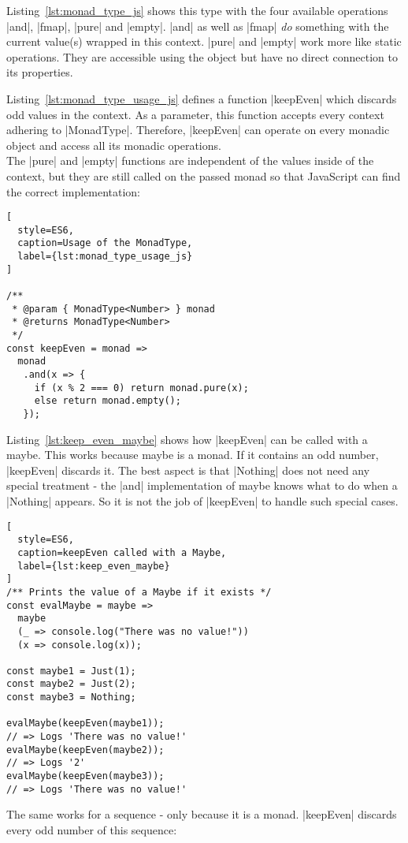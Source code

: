 Listing~\ref{lst:monad_type_js} shows this type with the four available
operations |and|, |fmap|, |pure| and |empty|. |and| as well as |fmap| \textit{do}
something with the current value(s) wrapped in this context. |pure| and |empty|
work more like static operations. They are accessible using the object but have
no direct connection to its properties. 

Listing~\ref{lst:monad_type_usage_js} defines a function |keepEven| which
discards odd values in the context. As a parameter, this function accepts every context
adhering to |MonadType|. Therefore, |keepEven| can operate on every monadic
object and access all its monadic operations.\\
The |pure| and |empty| functions are independent of the values inside of the
context, but they are still called on the passed monad so that JavaScript can
find the correct implementation:

\begin{lstlisting}[
  style=ES6,
  caption=Usage of the MonadType,
  label={lst:monad_type_usage_js}
]

/**
 * @param { MonadType<Number> } monad
 * @returns MonadType<Number>
 */
const keepEven = monad => 
  monad
   .and(x => {
     if (x % 2 === 0) return monad.pure(x);
     else return monad.empty();
   }); 
\end{lstlisting}

Listing~\ref{lst:keep_even_maybe} shows how |keepEven| can be called with a
maybe. This works because maybe is a monad. If it contains an odd number,
|keepEven| discards it. The best aspect is that |Nothing| does not need any
special treatment - the |and| implementation of maybe knows what to do when a
|Nothing| appears. So it is not the job of |keepEven| to handle such special
cases.

\begin{lstlisting}[
  style=ES6,
  caption=keepEven called with a Maybe,
  label={lst:keep_even_maybe}
]
/** Prints the value of a Maybe if it exists */
const evalMaybe = maybe =>
  maybe
  (_ => console.log("There was no value!"))
  (x => console.log(x));

const maybe1 = Just(1);
const maybe2 = Just(2);
const maybe3 = Nothing;

evalMaybe(keepEven(maybe1));
// => Logs 'There was no value!'
evalMaybe(keepEven(maybe2));
// => Logs '2'
evalMaybe(keepEven(maybe3));
// => Logs 'There was no value!'
\end{lstlisting}

The same works for a sequence - only because it is a monad. |keepEven| discards
every odd number of this sequence:

